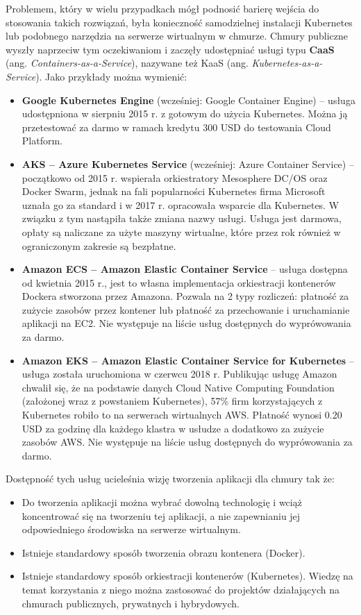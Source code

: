 \documentclass[12pt,a4paper,twoside,titlepage,openright]{book}
\begin{document}
Problemem, który w wielu przypadkach mógł podnosić barierę wejścia do stosowania takich rozwiązań, była konieczność samodzielnej instalacji Kubernetes lub podobnego narzędzia na serwerze wirtualnym w chmurze. Chmury publiczne wyszły naprzeciw tym oczekiwaniom i zaczęły udostępniać usługi typu \textbf{CaaS} (ang. \textit{Containers-as-a-Service}), nazywane też KaaS (ang. \textit{Kubernetes-as-a-Service}). Jako przykłady można wymienić:
\begin{itemize}
\item \textbf{Google Kubernetes Engine} (wcześniej: Google Container Engine) -- usługa udostępniona w sierpniu 2015 r. \cite{siteGoogleBlogKubernetes} z gotowym do użycia Kubernetes. Można ją przetestować za darmo w ramach kredytu 300 USD do testowania Cloud Platform.\cite{siteGoogleTry}
\item \textbf{AKS -- Azure Kubernetes Service} (wcześniej: Azure Container Service) -- początkowo od 2015 r. wspierała orkiestratory Mesosphere DC/OS oraz Docker Swarm, jednak na fali popularności Kubernetes firma Microsoft uznała go za standard i w 2017 r. opracowała wsparcie dla Kubernetes. W związku z tym nastąpiła także zmiana nazwy usługi. \cite{siteMicrosoftBlogAks} Usługa jest darmowa\cite{siteAksPricing}, opłaty są naliczane za użyte maszyny wirtualne, które przez rok również w ograniczonym zakresie są bezpłatne.\cite{siteAzureTry}
\item \textbf{Amazon ECS -- Amazon Elastic Container Service} -- usługa dostępna od kwietnia 2015 r., jest to własna implementacja orkiestracji kontenerów Dockera stworzona przez Amazona. Pozwala na 2 typy rozliczeń: płatność za zużycie zasobów przez kontener lub płatność za przechowanie i uruchamianie aplikacji na EC2.\cite{siteAmazonEcsPricing} Nie występuje na liście usług dostępnych do wyprówowania za darmo.\cite{siteAmazonTry}
\item \textbf{Amazon EKS -- Amazon Elastic Container Service for Kubernetes} -- usługa została uruchomiona w czerwcu 2018 r. Publikując usługę Amazon chwalił się, że na podstawie danych Cloud Native Computing Foundation (założonej wraz z powstaniem Kubernetes), 57\% firm korzystających z Kubernetes robiło to na serwerach wirtualnych AWS. Płatność wynosi 0.20 USD za godzinę dla każdego klastra w usłudze a dodatkowo za zużycie zasobów AWS.\cite{siteAmazonEksPricing} Nie występuje na liście usług dostępnych do wyprówowania za darmo.\cite{siteAmazonTry}
\end{itemize}

Dostępność tych usług ucieleśnia wizję tworzenia aplikacji dla chmury tak że:
\begin{itemize}
\item Do tworzenia aplikacji można wybrać dowolną technologię i wciąż koncentrować się na tworzeniu tej aplikacji, a nie zapewnianiu jej odpowiedniego środowiska na serwerze wirtualnym.
\item Istnieje standardowy sposób tworzenia obrazu kontenera (Docker).
\item Istnieje standardowy sposób orkiestracji kontenerów (Kubernetes). Wiedzę na temat korzystania z niego można zastosować do projektów działających na chmurach publicznych, prywatnych i hybrydowych.
\end{itemize}
\end{document}
